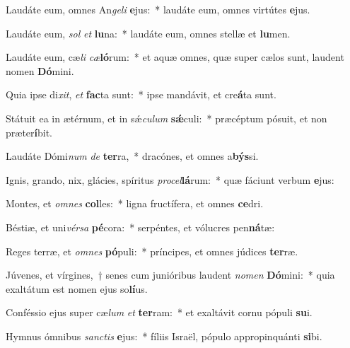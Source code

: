 \item Laudáte eum, omnes An\textit{ge}\textit{li} \textbf{e}jus:~* laudáte eum, omnes virtútes \textbf{e}jus.
\item Laudáte eum, \textit{sol} \textit{et} \textbf{lu}na:~* laudáte eum, omnes stellæ et \textbf{lu}men.
\item Laudáte eum, cæ\textit{li} \textit{cæ}\textbf{ló}rum:~* et aquæ omnes, quæ super cælos sunt, laudent nomen \textbf{Dó}mini.
\item Quia ipse di\textit{xit}, \textit{et} \textbf{fac}ta sunt:~* ipse mandávit, et cre\textbf{á}ta sunt.
\item Státuit ea in ætérnum, et in sǽ\textit{cu}\textit{lum} \textbf{sǽ}culi:~* præcéptum pósuit, et non præter\textbf{í}bit.
\item Laudáte Dómi\textit{num} \textit{de} \textbf{ter}ra,~* dracónes, et omnes a\textbf{býs}si.
\item Ignis, grando, nix, glácies, spíritus \textit{pro}\textit{cel}\textbf{lá}rum:~* quæ fáciunt verbum \textbf{e}jus:
\item Montes, et \textit{om}\textit{nes} \textbf{col}les:~* ligna fructífera, et omnes \textbf{ce}dri.
\item Béstiæ, et uni\textit{vér}\textit{sa} \textbf{pé}cora:~* serpéntes, et vólucres pen\textbf{ná}tæ:
\item Reges terræ, et \textit{om}\textit{nes} \textbf{pó}puli:~* príncipes, et omnes júdices \textbf{ter}ræ.
\item Júvenes, et vírgines,~† senes cum junióribus laudent \textit{no}\textit{men} \textbf{Dó}mini:~* quia exaltátum est nomen ejus so\textbf{lí}us.
\item Conféssio ejus super cæ\textit{lum} \textit{et} \textbf{ter}ram:~* et exaltávit cornu pópuli \textbf{su}i.
\item Hymnus ómnibus \textit{sanc}\textit{tis} \textbf{e}jus:~* fíliis Israël, pópulo appropinquánti \textbf{si}bi.
